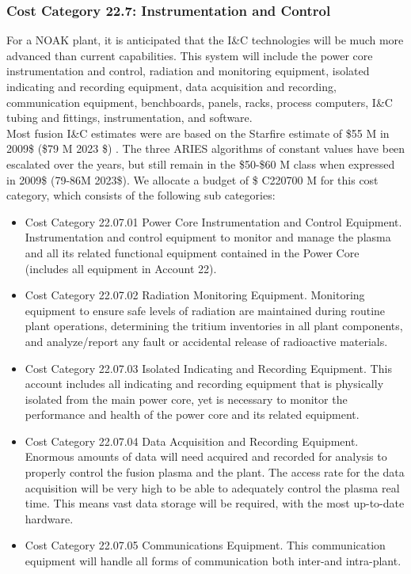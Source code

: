 
\subsubsection{Cost Category 22.7: Instrumentation and Control }

For a NOAK plant, it is anticipated that the I\&C technologies will be much more advanced than current  capabilities. This system will include the power core instrumentation and control, radiation and  monitoring equipment, isolated indicating and recording equipment, data acquisition and  recording, communication equipment, benchboards, panels, racks, process computers, I\&C tubing and fittings, instrumentation, and software.\\

Most fusion I\&C estimates were are based on the Starfire  estimate of \$55 M in 2009\$ (\$79 M 2023 \$) . The three ARIES algorithms of constant values have been  escalated over the years, but still remain in the \$50-\$60 M class when expressed in 2009\$ (79-86M 2023\$).  We allocate a budget of \$ C220700 M for this cost category, which consists of the following sub categories:

\begin{itemize}
\item Cost Category 22.07.01 Power Core Instrumentation and Control Equipment. Instrumentation and control equipment to monitor and manage the plasma and all  its related functional equipment contained in the Power Core (includes all equipment in Account 22).

\item Cost Category 22.07.02 Radiation Monitoring Equipment. Monitoring equipment to ensure safe levels of radiation are maintained  during routine plant operations, determining the tritium inventories in all plant components, and  analyze/report any fault or accidental release of radioactive materials. 

\item Cost Category 22.07.03 Isolated Indicating and Recording Equipment. This account includes all  indicating and recording equipment that is physically isolated from the main power core, yet is  necessary to monitor the performance and health of the power core and its related equipment. 

\item Cost Category 22.07.04 Data Acquisition and Recording Equipment. Enormous amounts of data will need acquired and recorded  for analysis to properly control the fusion plasma and the plant. The access rate for the data  acquisition will be very high to be able to adequately control the plasma real time. This means vast data storage will be required, with the most up-to-date hardware.

\item Cost Category 22.07.05 Communications Equipment. This communication equipment will handle  all forms of communication both inter-and intra-plant. 

\end{itemize}